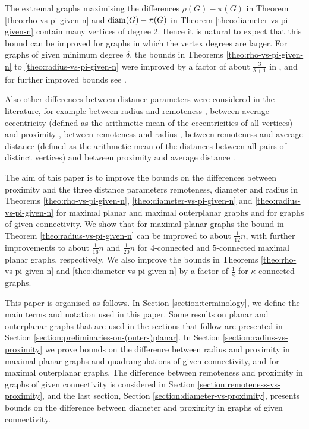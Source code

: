 \documentclass[a4paper,11pt]{article}
\begin{document}
The extremal graphs maximising the differences $\rho(G) - \pi(G)$ in 
Theorem \ref{theo:rho-vs-pi-given-n} and ${\rm diam}(G)-\pi(G)$ in 
Theorem \ref{theo:diameter-vs-pi-given-n}
contain many vertices of 
degree $2$. Hence it is natural to expect that this bound can be improved for graphs in which
the vertex degrees are larger. For graphs of given minimum degree $\delta$, the bounds in 
Theorems \ref{theo:rho-vs-pi-given-n} to \ref{theo:radius-vs-pi-given-n} were improved by a 
factor of about $\frac{3}{\delta+1}$ 
in \cite{Dan2016}, and for further improved bounds see \cite{DanMaf2022}. 


Also other differences between distance parameters were considered in the literature, for 
example between radius and remoteness \cite{HuaCheDas2015}, between average eccentricity
(defined as the arithmetic mean of the eccentricities of all vertices) and proximity
\cite{MaWuZha2012}, between remoteness and radius \cite{WuZha2014}, between  
remoteness and average distance (defined as the arithmetic mean of the distances
between all pairs of distinct vertices) \cite{WuZha2014}
and between proximity and average distance \cite{Sed2013}. 




The aim of this paper is to improve the bounds on the differences between proximity
and the three distance parameters remoteness, diameter and radius in 
Theorems \ref{theo:rho-vs-pi-given-n}, \ref{theo:diameter-vs-pi-given-n} and
\ref{theo:radius-vs-pi-given-n} 
for maximal planar and maximal outerplanar graphs and for graphs of given connectivity.
We show that for maximal planar graphs the bound in Theorem \ref{theo:radius-vs-pi-given-n} 
can be improved to about $\frac{1}{12}n$, with further improvements to 
about $\frac{1}{16}n$ and $\frac{1}{20}n$ for $4$-connected and $5$-connected maximal
planar graphs, respectively. We also improve the bounds in 
Theorems \ref{theo:rho-vs-pi-given-n} and \ref{theo:diameter-vs-pi-given-n} by a factor 
of $\frac{1}{\kappa}$ for $\kappa$-connected graphs.  

This paper is organised as follows. 
In Section \ref{section:terminology}, we define the main terms and notation used in this paper.
Some results on planar and outerplanar graphs that are used in the sections that follow are presented
in Section \ref{section:preliminaries-on-(outer-)planar}.
In Section \ref{section:radius-vs-proximity} we prove bounds on the difference between radius and 
proximity in maximal planar graphs and quadrangulations of given connectivity, and for maximal outerplanar graphs. 
The difference between remoteness and proximity in graphs of given connectivity is considered in 
Section \ref{section:remoteness-vs-proximity}, and the last section, Section \ref{section:diameter-vs-proximity},
presents bounds on the difference between diameter and proximity in graphs of given connectivity.    
\end{document}
